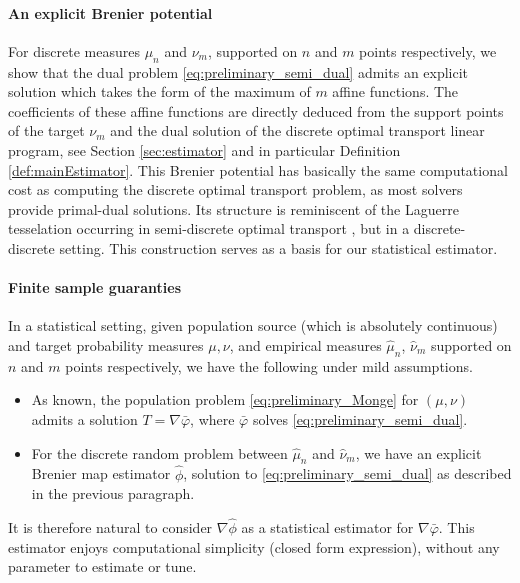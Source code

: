 \documentclass[11pt]{article}
\newcommand{\1}{\mathbbm{1}}
\numberwithin{equation}{section}
\begin{document}
\paragraph{An explicit  Brenier potential} For discrete measures $\mu_n$ and $\nu_m$, supported on $n$ and $m$ points respectively, we show that the dual problem \eqref{eq:preliminary_semi_dual} admits an explicit solution which takes the form of the maximum of $m$ affine functions.  The coefficients of these affine functions are directly deduced from the support points of the target $\nu_m$ and the dual solution of the discrete optimal transport linear program, see Section \ref{sec:estimator} and in particular Definition \ref{def:mainEstimator}. This Brenier potential has basically the same computational cost as computing the discrete optimal transport problem, as most solvers provide primal-dual solutions. Its structure is reminiscent of the Laguerre tesselation occurring in semi-discrete optimal transport \cite{aurenhammer1998minkowski}, but in a discrete-discrete setting. This construction serves as a basis for our statistical estimator.

\paragraph{Finite sample guaranties} In a statistical setting, given population source (which is absolutely continuous) and target probability measures $\mu,\nu$, and empirical measures $\hat{\mu}_n$, $\hat{\nu}_m$ supported on $n$ and $m$ points respectively, we have the following under mild assumptions.
\begin{itemize}
    \item As known, the population problem \eqref{eq:preliminary_Monge} for $(\mu,\nu)$ admits a solution $T = \nabla \bar{\varphi}$, where $\bar{\varphi}$ solves \eqref{eq:preliminary_semi_dual}.
    \item For the discrete random problem between $\hat{\mu}_n$ and $\hat{\nu}_m$, we have an explicit Brenier  map estimator $\hat{\phi}$, solution to \eqref{eq:preliminary_semi_dual} as described in the previous paragraph.
\end{itemize}
It is therefore natural to consider $\nabla \hat{\phi}$ as a statistical estimator for $\nabla \bar{\varphi}$. This estimator enjoys computational simplicity (closed form expression), without any parameter to estimate or tune. 
\end{document}
